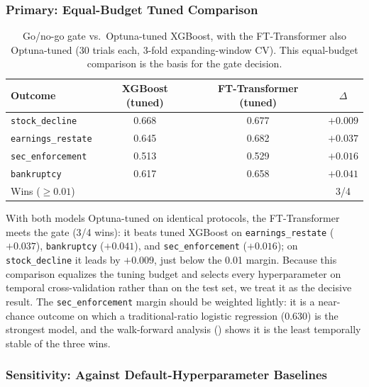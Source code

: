 \subsubsection{Primary: Equal-Budget Tuned Comparison}

\begin{table}[ht]
  \centering
  \caption{Go/no-go gate vs.\ Optuna-tuned XGBoost, with the FT-Transformer also Optuna-tuned (30 trials each, 3-fold expanding-window CV). This equal-budget comparison is the basis for the gate decision.}
  \label{tab:gate_tuned}
  \small
  \begin{tabular}{@{}lccc@{}}
    \toprule
    Outcome & XGBoost (tuned) & FT-Transformer (tuned) & $\Delta$ \\
    \midrule
    \texttt{stock\_decline} & 0.668 & 0.677 & $+0.009$ \\
    \texttt{earnings\_restate} & 0.645 & 0.682 & $+0.037$ \\
    \texttt{sec\_enforcement} & 0.513 & 0.529 & $+0.016$ \\
    \texttt{bankruptcy} & 0.617 & 0.658 & $+0.041$ \\
    \midrule
    Wins ($\geq 0.01$) & & & 3/4 \\
    \bottomrule
  \end{tabular}
\end{table}

With both models Optuna-tuned on identical protocols, the FT-Transformer meets the gate (3/4 wins): it beats tuned XGBoost on \texttt{earnings\_restate} ($+0.037$), \texttt{bankruptcy} ($+0.041$), and \texttt{sec\_enforcement} ($+0.016$); on \texttt{stock\_decline} it leads by $+0.009$, just below the 0.01 margin. Because this comparison equalizes the tuning budget and selects every hyperparameter on temporal cross-validation rather than on the test set, we treat it as the decisive result. The \texttt{sec\_enforcement} margin should be weighted lightly: it is a near-chance outcome on which a traditional-ratio logistic regression (0.630) is the strongest model, and the walk-forward analysis () shows it is the least temporally stable of the three wins.

\subsubsection{Sensitivity: Against Default-Hyperparameter Baselines}


